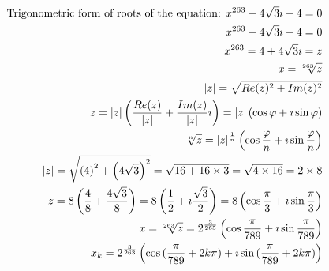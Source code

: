 \documentclass{article}
\newcommand{\stkout}[1]{\ifmmode\text{\sout{\ensuremath{#1}}}\else\sout{#1}\fi}
\begin{document}
    \begin{align*}
        \text{Trigonometric form of roots of the equation: } x ^ {263} - 4\sqrt3\imath -4 = 0\\
            x ^ {263} - 4\sqrt3\imath -4 = 0\\
            x ^ {263} = 4 + 4\sqrt3\imath = z\\
            x = \sqrt[263]{z}\\
            |z| = \sqrt{Re(z) ^ 2 + Im(z) ^ 2}\\
            z  = |z|\left(\frac{ Re(z) }{|z|} + \frac{Im(z)}{|z|}\imath\right) = |z|\left(\cos\varphi + \imath\sin\varphi\right)\\
            \sqrt[n]{z}  = |z| ^ \frac{1}{n}\left(\cos{\frac{\varphi}{n}} + \imath\sin{\frac{\varphi}{n}}\right)\\
            |z| = \sqrt{\left(4\right)^2 + \left(4\sqrt3\right) ^ 2}
            = \sqrt{16 + 16 \times 3}
            = \sqrt{4 \times 16} = 2 \times 8\\
            z = 8\left(\frac{\stkout{4}}{\stkout{8}} + \frac{\stkout{4}\sqrt3}{\stkout{8}}\right)
            = 8\left(\frac{1}{2} + \imath\frac{\sqrt3}{2}\right)
            = 8\left(\cos\frac{\pi}{3} + \imath\sin\frac{\pi}{3}\right)\\
            x = \sqrt[263]{z} = 2 ^ {\frac{3}{263}}\left(\cos\frac{\pi}{789} + \imath\sin\frac{\pi}{789}\right)\\
            x_k = 2 ^ {\frac{3}{263}}\left(\cos{(\frac{\pi}{789} + 2k\pi)} + \imath\sin{(\frac{\pi}{789} + 2k\pi)}\right)\\
    \end{align*}
\end{document}
